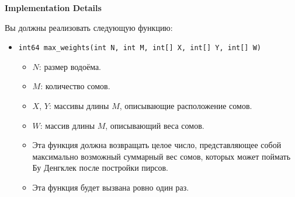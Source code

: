 \textbf{Implementation Details}

Вы должны реализовать следующую функцию:

\begin{itemize}
    \item \texttt{int64 max\_weights(int N, int M, int[] X, int[] Y, int[] W)}
    \begin{itemize}
        \item $N$: размер водоёма.
        \item $M$: количество сомов.
        \item $X$, $Y$: массивы длины $M$, описывающие расположение сомов.
        \item $W$: массив длины $M$, описывающий веса сомов.
        \item Эта функция должна возвращать целое число, представляющее собой максимально возможный суммарный вес сомов, которых может поймать Бу Денгклек после постройки пирсов.
        \item Эта функция будет вызвана ровно один раз.
    \end{itemize}
\end{itemize}